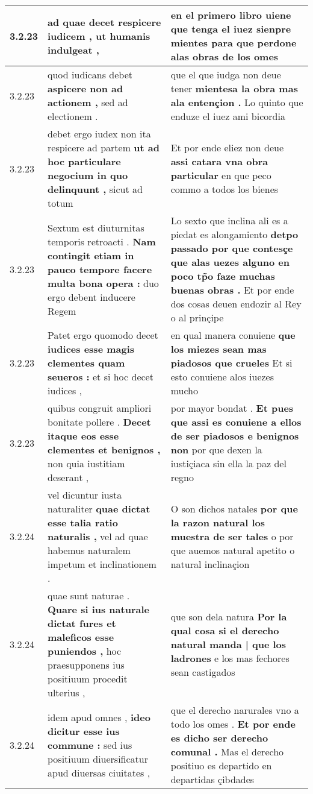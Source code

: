 \begin{tabular}{|p{1cm}|p{6.5cm}|p{6.5cm}|}
3.2.23 & ad quae decet \textbf{ respicere iudicem , } ut humanis indulgeat , & en el primero libro \textbf{ uiene que tenga el iuez sienpre mientes } para que perdone alas obras de los omes \\\hline
3.2.23 & quod iudicans debet \textbf{ aspicere non ad actionem , } sed ad electionem . & que el que iudga non deue tener \textbf{ mientesa la obra mas ala entençion . } Lo quinto que enduze el iuez ami bicordia \\\hline
3.2.23 & debet ergo iudex non ita respicere ad partem \textbf{ ut ad hoc particulare negocium in quo delinquunt , } sicut ad totum & Et por ende eliez non deue \textbf{ assi catara vna obra particular } en que peco commo a todos los bienes \\\hline
3.2.23 & Sextum est diuturnitas temporis retroacti . \textbf{ Nam contingit etiam in pauco tempore facere multa bona opera : } duo ergo debent inducere Regem & Lo sexto que inclina ali es a piedat es alongamiento \textbf{ detpo passado por que contesçe que alas uezes alguno en poco tp̃o faze muchas buenas obras . } Et por ende dos cosas deuen endozir al Rey o al prinçipe \\\hline
3.2.23 & Patet ergo quomodo decet \textbf{ iudices esse magis clementes quam seueros : } et si hoc decet iudices , & en qual manera conuiene \textbf{ que los miezes sean mas piadosos que crueles } Et si esto conuiene alos iuezes mucho \\\hline
3.2.23 & quibus congruit ampliori bonitate pollere . \textbf{ Decet itaque eos esse clementes et benignos , } non quia iustitiam deserant , & por mayor bondat . \textbf{ Et pues que assi es conuiene a ellos de ser piadosos e benignos non } por que dexen la iustiçiaca sin ella la paz del regno \\\hline
3.2.24 & vel dicuntur iusta naturaliter \textbf{ quae dictat esse talia ratio naturalis , } vel ad quae habemus naturalem impetum et inclinationem . & O son dichos natales \textbf{ por que la razon natural los muestra de ser tales } o por que auemos natural apetito o natural inclinaçion \\\hline
3.2.24 & quae sunt naturae . \textbf{ Quare si ius naturale dictat fures et maleficos esse puniendos , } hoc praesupponens ius positiuum procedit ulterius , & que son dela natura \textbf{ Por la qual cosa si el derecho natural manda | que los ladrones } e los mas fechores sean castigados \\\hline
3.2.24 & idem apud omnes , \textbf{ ideo dicitur esse ius commune : } sed ius positiuum diuersificatur apud diuersas ciuitates , & que el derecho narurales vno a todo los omes . \textbf{ Et por ende es dicho ser derecho comunal . } Mas el derecho positiuo es departido en departidas çibdades \\\hline

\end{tabular}
